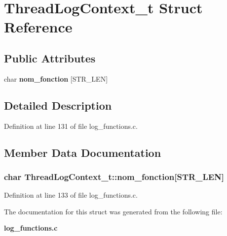 \section{ThreadLogContext\_\-t Struct Reference}
\label{structThreadLogContext__t}
\subsection*{Public Attributes}
\begin{CompactItemize}
\item 
char {\bf nom\_\-fonction} [STR\_\-LEN]
\end{CompactItemize}


\subsection{Detailed Description}


Definition at line 131 of file log\_\-functions.c.

\subsection{Member Data Documentation}
\subsubsection[{nom\_\-fonction}]{\setlength{\rightskip}{0pt plus 5cm}char {\bf ThreadLogContext\_\-t::nom\_\-fonction}[STR\_\-LEN]}\label{structThreadLogContext__t_e7157160ec953a6b2ea48744becb8978}




Definition at line 133 of file log\_\-functions.c.

The documentation for this struct was generated from the following file:\begin{CompactItemize}
\item 
{\bf log\_\-functions.c}\end{CompactItemize}
